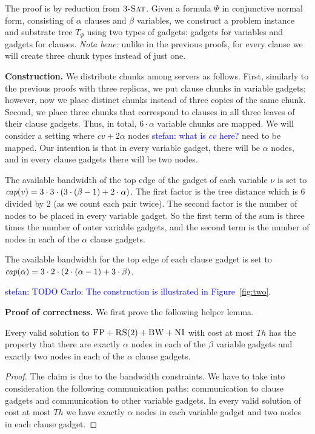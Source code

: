 \documentclass[9pt,twocolumn]{scrartcl}
\newcommand{\stefan}[1]{\textcolor{blue}{stefan: #1}}
\newcommand{\variab}{\nu}
\newcommand{\clauses}{\alpha}
\newcommand{\vars}{\beta}
\newcommand{\capa}{\emph{cap}}
\newcommand{\CC}{\textsc{NI}}
\newcommand{\FP}{\textsc{FP}}
\newcommand{\RS}{\textsc{RS}}
\newcommand{\BW}{\textsc{BW}}
\newcommand{\TSAT}{\textsc{3-Sat}}
\newcommand{\Formula}{\ensuremath{\Psi}}
\newcommand{\Thr}{\ensuremath{Th}}
\begin{document}
\begin{appendix}
The proof is by reduction from $\TSAT$. Given a formula $\Formula$ in
conjunctive normal form, consisting of $\clauses$ clauses and $\vars$ variables, we construct a problem instance and substrate tree
$T_{\Formula}$ using two types of gadgets: gadgets for variables and
gadgets for clauses. \emph{Nota bene:}
unlike in the previous proofs, for every clause we will create three chunk types instead of just one.

\textbf{Construction.}
We distribute chunks among servers as follows. First,
similarly to the previous proofs with three replicas, we put clause chunks in
variable gadgets; however, now we place distinct chunks instead of
three copies of the same chunk. Second, we place three chunks that
correspond to clauses in all three leaves of their clause gadgets.
Thus, in total, $6 \cdot \clauses$ variable chunks are mapped.
We will consider a setting where $cv + 2\clauses$ nodes \stefan{what is $cv$ here?} need to be mapped. Our intention is that in
every variable gadget, there will be $\clauses$ nodes,
 and in every clause
gadgets there will be two nodes.

The available bandwidth of the top edge of the gadget of each variable $\variab$ is set to
$\capa(v) = 3  \cdot  3  \cdot  (3  \cdot  (\vars - 1) + 2  \cdot  \clauses) $.
The first factor is the tree distance which is 6 divided by 2 (as
we count each pair twice). The second factor is
the number of nodes to be placed in every variable gadget.
So the first term of the
sum is three times the number of outer variable gadgets,
and the second term is the
number of nodes in each of the $\clauses$ clause gadgets.

The available bandwidth for the top edge of each clause gadget is set to
$\capa(\clauses) = 3  \cdot  2  \cdot  (2  \cdot  (\clauses - 1) + 3  \cdot  \vars) $.

\stefan{TODO Carlo: The construction is illustrated in Figure~\ref{fig:two}.}


\textbf{Proof of correctness.}
We first prove the following helper lemma.
\begin{lemma}
Every valid solution to $\FP+\RS(2)+\BW+\CC$
with cost at most $\Thr$ has the property that
there are exactly $\clauses$ nodes in each of the $\vars$ variable gadgets
and exactly two nodes in each of the $\clauses$ clause gadgets.
\end{lemma}
\begin{proof}
The claim is due to the bandwidth constraints. We have to take into
consideration the following communication paths:
communication to clause gadgets and
communication to
other variable gadgets.
In every valid solution of cost at most $\Thr$ we have exactly
$\clauses$ nodes in each variable gadget and two nodes in each clause gadget.
\end{proof}


\end{appendix}
\end{document}

